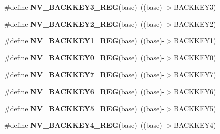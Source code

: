 \begin{DoxyCompactItemize}
\item 
\#define {\bfseries N\+V\+\_\+\+B\+A\+C\+K\+K\+E\+Y3\+\_\+\+R\+EG}(base)~((base)-\/$>$B\+A\+C\+K\+K\+E\+Y3)\hypertarget{group__NV__Register__Accessor__Macros_gafc7fe743ed5040278c07df44c3679f34}{}\label{group__NV__Register__Accessor__Macros_gafc7fe743ed5040278c07df44c3679f34}

\item 
\#define {\bfseries N\+V\+\_\+\+B\+A\+C\+K\+K\+E\+Y2\+\_\+\+R\+EG}(base)~((base)-\/$>$B\+A\+C\+K\+K\+E\+Y2)\hypertarget{group__NV__Register__Accessor__Macros_gac4ba0b0f5728c1f8cccf007efe73b218}{}\label{group__NV__Register__Accessor__Macros_gac4ba0b0f5728c1f8cccf007efe73b218}

\item 
\#define {\bfseries N\+V\+\_\+\+B\+A\+C\+K\+K\+E\+Y1\+\_\+\+R\+EG}(base)~((base)-\/$>$B\+A\+C\+K\+K\+E\+Y1)\hypertarget{group__NV__Register__Accessor__Macros_ga7d1008712187c004855ee43a54b4e2a6}{}\label{group__NV__Register__Accessor__Macros_ga7d1008712187c004855ee43a54b4e2a6}

\item 
\#define {\bfseries N\+V\+\_\+\+B\+A\+C\+K\+K\+E\+Y0\+\_\+\+R\+EG}(base)~((base)-\/$>$B\+A\+C\+K\+K\+E\+Y0)\hypertarget{group__NV__Register__Accessor__Macros_ga2fb8743f4bd1477b6df6081156659fe4}{}\label{group__NV__Register__Accessor__Macros_ga2fb8743f4bd1477b6df6081156659fe4}

\item 
\#define {\bfseries N\+V\+\_\+\+B\+A\+C\+K\+K\+E\+Y7\+\_\+\+R\+EG}(base)~((base)-\/$>$B\+A\+C\+K\+K\+E\+Y7)\hypertarget{group__NV__Register__Accessor__Macros_ga4e4a56e18420d4898e7f8804b722536e}{}\label{group__NV__Register__Accessor__Macros_ga4e4a56e18420d4898e7f8804b722536e}

\item 
\#define {\bfseries N\+V\+\_\+\+B\+A\+C\+K\+K\+E\+Y6\+\_\+\+R\+EG}(base)~((base)-\/$>$B\+A\+C\+K\+K\+E\+Y6)\hypertarget{group__NV__Register__Accessor__Macros_ga66028631e0b19586c65f3db951474e08}{}\label{group__NV__Register__Accessor__Macros_ga66028631e0b19586c65f3db951474e08}

\item 
\#define {\bfseries N\+V\+\_\+\+B\+A\+C\+K\+K\+E\+Y5\+\_\+\+R\+EG}(base)~((base)-\/$>$B\+A\+C\+K\+K\+E\+Y5)\hypertarget{group__NV__Register__Accessor__Macros_ga8c8a046af59b1a140ff75cc826b355aa}{}\label{group__NV__Register__Accessor__Macros_ga8c8a046af59b1a140ff75cc826b355aa}

\item 
\#define {\bfseries N\+V\+\_\+\+B\+A\+C\+K\+K\+E\+Y4\+\_\+\+R\+EG}(base)~((base)-\/$>$B\+A\+C\+K\+K\+E\+Y4)\hypertarget{group__NV__Register__Accessor__Macros_gaf87830b9bc5bb55e664df8929d49eac1}{}\label{group__NV__Register__Accessor__Macros_gaf87830b9bc5bb55e664df8929d49eac1}


\end{DoxyCompactItemize}
